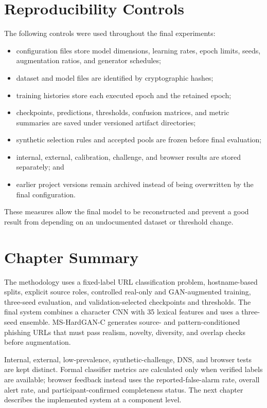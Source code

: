 \section{Reproducibility Controls}

The following controls were used throughout the final experiments:

\begin{itemize}
    \item configuration files store model dimensions, learning rates, epoch
    limits, seeds, augmentation ratios, and generator schedules;
    \item dataset and model files are identified by cryptographic hashes;
    \item training histories store each executed epoch and the retained epoch;
    \item checkpoints, predictions, thresholds, confusion matrices, and metric
    summaries are saved under versioned artifact directories;
    \item synthetic selection rules and accepted pools are frozen before final
    evaluation;
    \item internal, external, calibration, challenge, and browser results are
    stored separately; and
    \item earlier project versions remain archived instead of being overwritten
    by the final configuration.
\end{itemize}

These measures allow the final model to be reconstructed and prevent a good
result from depending on an undocumented dataset or threshold change.

\section{Chapter Summary}

The methodology uses a fixed-label URL classification problem, hostname-based
splits, explicit source roles, controlled real-only and GAN-augmented training,
three-seed evaluation, and validation-selected checkpoints and thresholds. The
final system combines a character CNN with 35 lexical features and uses a
three-seed ensemble. MS-HardGAN-C generates source- and pattern-conditioned
phishing URLs that must pass realism, novelty, diversity, and overlap checks
before augmentation.

Internal, external, low-prevalence, synthetic-challenge, DNS, and browser tests
are kept distinct. Formal classifier metrics are calculated only when verified
labels are available; browser feedback instead uses the reported-false-alarm
rate, overall alert rate, and participant-confirmed completeness status. The
next chapter describes the implemented system at a component level.
